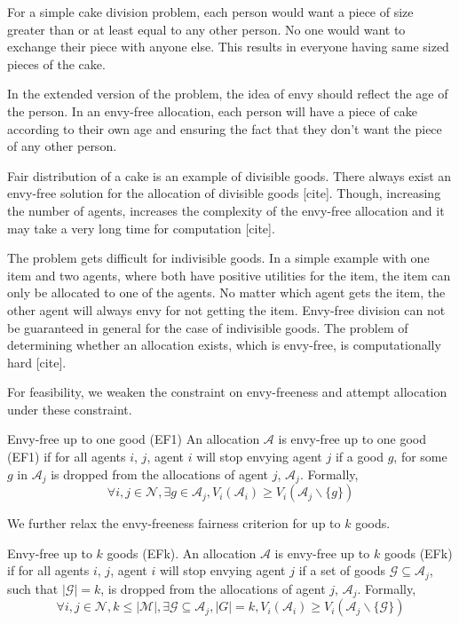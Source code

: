 For a simple cake division problem, each person would want a piece of size greater than or at least equal to any other person. No one would want to exchange their piece with anyone else. This results in everyone having same sized pieces of the cake.

In the extended version of the problem, the idea of envy should reflect the age of the person. In an envy-free allocation, each person will have a piece of cake according to their own age and ensuring the fact that they don't want the piece of any other person. 

Fair distribution of a cake is an example of divisible goods. There always exist an envy-free solution for the allocation of divisible goods [cite]. Though, increasing the number of agents, increases the complexity of the envy-free allocation and it may take a very long time for computation [cite].

The problem gets difficult for indivisible goods. In a simple example with one item and two agents, where both have positive utilities for the item, the item can only be allocated to one of the agents. No matter which agent gets the item, the other agent will always envy for not getting the item. Envy-free division can not be guaranteed in general for the case of indivisible goods. The problem of determining whether an allocation exists, which is envy-free, is computationally hard [cite].

For feasibility, we weaken the constraint on envy-freeness and attempt allocation under these constraint.

\begin{definition}{Envy-free up to one good (EF1) \cite{caragiannis2016unreasonable}}
\label{def_ef1}
An allocation $\mathcal{A}$ is envy-free up to one good (EF1) if for all agents $i$, $j$, agent $i$ will stop envying agent $j$ if a good $g$, for some $g$ in $\mathcal{A}_j$ is dropped from the allocations of agent $j$, $\mathcal{A}_j$. Formally,
$$
    \forall i,j \in \mathcal{N}, \exists g \in \mathcal{A}_j, V_i(\mathcal{A}_i) \geq V_i(\mathcal{A}_j \backslash \{g\})
$$
\end{definition}

We further relax the envy-freeness fairness criterion for up to $k$ goods.

\begin{definition}{Envy-free up to $k$ goods (EFk).}
\label{def_efk}
An allocation $\mathcal{A}$ is envy-free up to $k$ goods (EFk) if for all agents $i$, $j$, agent $i$ will stop envying agent $j$ if a set of goods $\mathcal{G} \subseteq \mathcal{A}_j$, such that $|\mathcal{G}| = k$, is dropped from the allocations of agent $j$, $\mathcal{A}_j$. Formally,
$$
    \forall i,j \in \mathcal{N}, k \leq |\mathcal{M}|, \exists \mathcal{G} \subseteq \mathcal{A}_j, |G| = k, V_i(\mathcal{A}_i) \geq V_i(\mathcal{A}_j \backslash \{\mathcal{G}\})
$$
\end{definition}

